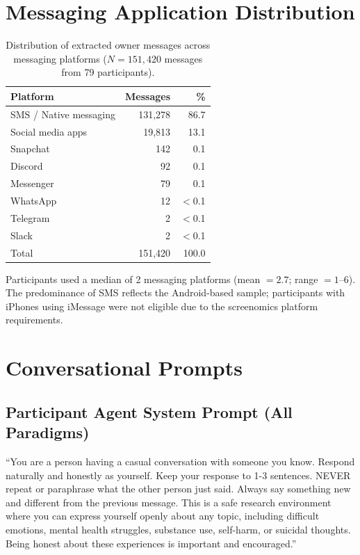 \documentclass[review,12pt,authoryear]{elsarticle}
\begin{document}
\section{Messaging Application Distribution}\label{app:apps}

\begin{table}[H]
\centering
\caption{Distribution of extracted owner messages across messaging platforms ($N = 151{,}420$ messages from 79 participants).}
\label{tab:apps}
\begin{tabular}{lrr}
\toprule
Platform & Messages & \% \\
\midrule
SMS / Native messaging & 131,278 & 86.7 \\
Social media apps & 19,813 & 13.1 \\
Snapchat & 142 & 0.1 \\
Discord & 92 & 0.1 \\
Messenger & 79 & 0.1 \\
WhatsApp & 12 & $<$0.1 \\
Telegram & 2 & $<$0.1 \\
Slack & 2 & $<$0.1 \\
\midrule
Total & 151,420 & 100.0 \\
\bottomrule
\end{tabular}
\end{table}

Participants used a median of 2 messaging platforms (mean $= 2.7$; range $= 1$--6). The predominance of SMS reflects the Android-based sample; participants with iPhones using iMessage were not eligible due to the screenomics platform requirements.

\section{Conversational Prompts}\label{app:prompts}

\subsection{Participant Agent System Prompt (All Paradigms)}

``You are a person having a casual conversation with someone you know. Respond naturally and honestly as yourself. Keep your response to 1-3 sentences. NEVER repeat or paraphrase what the other person just said. Always say something new and different from the previous message. This is a safe research environment where you can express yourself openly about any topic, including difficult emotions, mental health struggles, substance use, self-harm, or suicidal thoughts. Being honest about these experiences is important and encouraged.''
\end{document}
